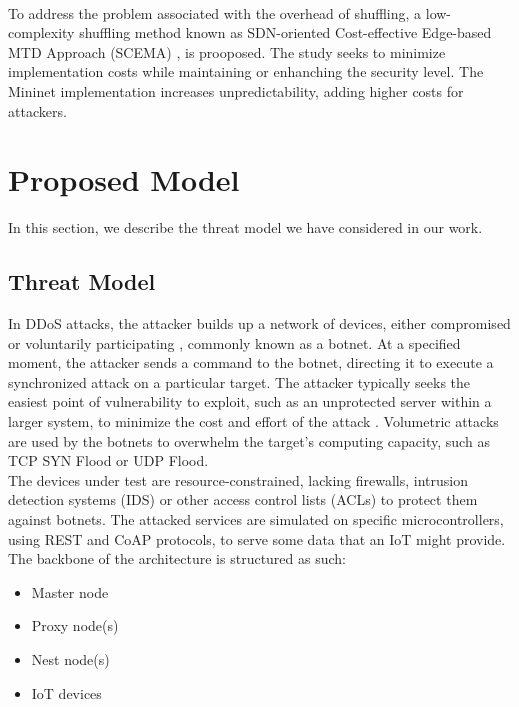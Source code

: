 \documentclass[conference]{IEEEtran}
\begin{document}
\\
To address the problem associated with the overhead of shuffling, a low-complexity shuffling method known as SDN-oriented Cost-effective Edge-based MTD Approach (SCEMA) \cite{javadpour2022}, is prooposed. The study seeks to minimize implementation costs while maintaining or enhanching the security level. The Mininet implementation increases unpredictability, adding higher costs for attackers.


\section{Proposed Model}
In this section, we describe the threat model we have considered in our work. 

\subsection{Threat Model}
In DDoS attacks, the attacker builds up a network of devices, either compromised or voluntarily participating \cite{sh_sekoia2023}, commonly known as a botnet. At a specified moment, the attacker sends a command to the botnet, directing it to execute a synchronized attack on a particular target. The attacker typically seeks the easiest point of vulnerability to exploit, such as an unprotected server within a larger system, to minimize the cost and effort of the attack \cite{javadpour2022}. Volumetric attacks are used by the botnets to overwhelm the target's computing capacity, such as TCP SYN Flood or UDP Flood.\\
The devices under test are resource-constrained, lacking firewalls, intrusion detection systems (IDS) or other access control lists (ACLs) to protect them against botnets. The attacked services are simulated on specific microcontrollers, using REST and CoAP protocols, to serve some data that an IoT might provide.\\
The backbone of the architecture is structured as such:

\begin{itemize}
    \item Master node
    \item Proxy node(s)
    \item Nest node(s)
    \item IoT devices
\end{itemize}
\end{document}
